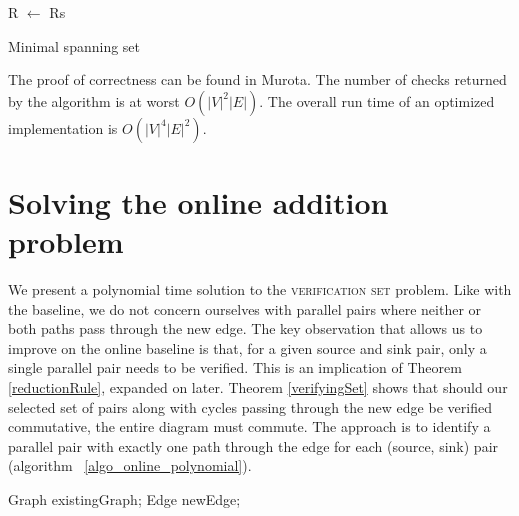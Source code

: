 \documentclass[sigplan,review,anonymous]{acmart}
\begin{document}
{\begin{algorithm}

R $\gets$ Rs\;
\;

\caption{Minimal spanning set}\label{algo_minimal_spanning_set}
\end{algorithm}

The proof of correctness can be found in Murota\cite{commutative}.
The number of checks returned by the algorithm is at worst $O(|V|^2|E|)$. The overall run time of an optimized implementation is $O(|V|^4|E|^2)$.

\section{Solving the online addition problem}

We present a polynomial time solution to the \textsc{verification set} problem.
Like with the baseline, we do not concern ourselves with parallel pairs where neither or both paths pass through the new edge.
The key observation that allows us to improve on the online baseline is that, for a given source and sink pair, only a single parallel pair needs to be verified. 
This is an implication of Theorem \ref{reductionRule}, expanded on later.
Theorem \ref{verifyingSet} shows that should our selected set of pairs along with cycles passing through the new edge be verified commutative, the entire diagram must commute. 
The approach is to identify a parallel pair with exactly one path through the edge for each (source, sink) pair (algorithm ~\ref{algo_online_polynomial}).

\begin{algorithm}
\DontPrintSemicolon
{}
Graph existingGraph;
Edge newEdge;


\end{algorithm}}
\end{document}
